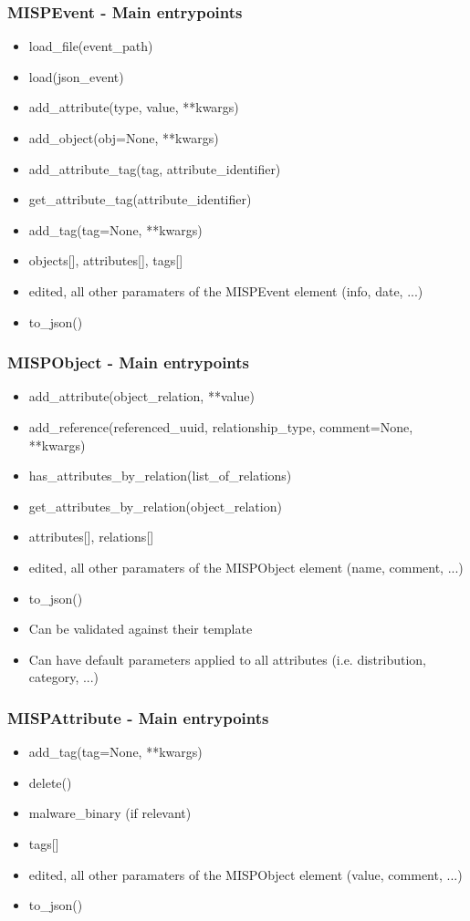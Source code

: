 \begin{frame}[fragile]
    \frametitle{MISPEvent - Main entrypoints}
    \begin{itemize}
        \item load\_file(event\_path)
        \item load(json\_event)
        \item add\_attribute(type, value, **kwargs)
        \item add\_object(obj=None, **kwargs)
        \item add\_attribute\_tag(tag, attribute\_identifier)
        \item get\_attribute\_tag(attribute\_identifier)
        \item add\_tag(tag=None, **kwargs)
        \item objects[], attributes[], tags[]
        \item edited, all other paramaters of the MISPEvent element (info, date, ...)
        \item to\_json()
    \end{itemize}
\end{frame}

\begin{frame}[fragile]
    \frametitle{MISPObject - Main entrypoints}
    \begin{itemize}
        \item add\_attribute(object\_relation, **value)
        \item add\_reference(referenced\_uuid, relationship\_type, comment=None, **kwargs)
        \item has\_attributes\_by\_relation(list\_of\_relations)
        \item get\_attributes\_by\_relation(object\_relation)
        \item attributes[], relations[]
        \item edited, all other paramaters of the MISPObject element (name, comment, ...)
        \item to\_json()
        \item Can be validated against their template
        \item Can have default parameters applied to all attributes (i.e. distribution, category, ...)
    \end{itemize}
\end{frame}

\begin{frame}[fragile]
    \frametitle{MISPAttribute - Main entrypoints}
    \begin{itemize}
        \item add\_tag(tag=None, **kwargs)
        \item delete()
        \item malware\_binary (if relevant)
        \item tags[]
        \item edited, all other paramaters of the MISPObject element (value, comment, ...)
        \item to\_json()
    \end{itemize}
\end{frame}

